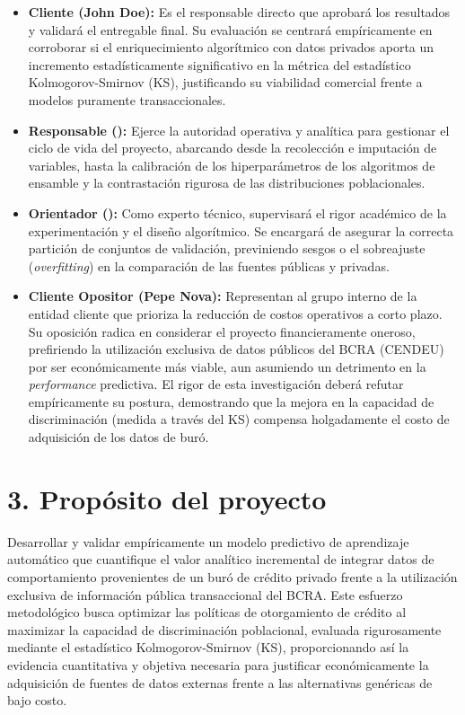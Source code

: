 \documentclass[
11pt, %
]{charter}
\begin{document}
\begin{itemize}
\item \textbf{Cliente (John Doe):} Es el responsable directo que aprobará los resultados y validará el entregable final. Su evaluación se centrará empíricamente en corroborar si el enriquecimiento algorítmico con datos privados aporta un incremento estadísticamente significativo en la métrica del estadístico Kolmogorov-Smirnov (KS), justificando su viabilidad comercial frente a modelos puramente transaccionales.
\item \textbf{Responsable (\authorname):} Ejerce la autoridad operativa y analítica para gestionar el ciclo de vida del proyecto, abarcando desde la recolección e imputación de variables, hasta la calibración de los hiperparámetros de los algoritmos de ensamble y la contrastación rigurosa de las distribuciones poblacionales.
\item \textbf{Orientador (\supname):} Como experto técnico, supervisará el rigor académico de la experimentación y el diseño algorítmico. Se encargará de asegurar la correcta partición de conjuntos de validación, previniendo sesgos o el sobreajuste (\textit{overfitting}) en la comparación de las fuentes públicas y privadas.
\item \textbf{Cliente Opositor (Pepe Nova):} Representan al grupo interno de la entidad cliente que prioriza la reducción de costos operativos a corto plazo. Su oposición radica en considerar el proyecto financieramente oneroso, prefiriendo la utilización exclusiva de datos públicos del BCRA (CENDEU) por ser económicamente más viable, aun asumiendo un detrimento en la \textit{performance} predictiva. El rigor de esta investigación deberá refutar empíricamente su postura, demostrando que la mejora en la capacidad de discriminación (medida a través del KS) compensa holgadamente el costo de adquisición de los datos de buró.
\end{itemize}

\section{3. Propósito del proyecto}
\label{sec:proposito}

Desarrollar y validar empíricamente un modelo predictivo de aprendizaje automático que cuantifique el valor analítico incremental de integrar datos de comportamiento provenientes de un buró de crédito privado frente a la utilización exclusiva de información pública transaccional del BCRA. Este esfuerzo metodológico busca optimizar las políticas de otorgamiento de crédito al maximizar la capacidad de discriminación poblacional, evaluada rigurosamente mediante el estadístico Kolmogorov-Smirnov (KS), proporcionando así la evidencia cuantitativa y objetiva necesaria para justificar económicamente la adquisición de fuentes de datos externas frente a las alternativas genéricas de bajo costo.
\end{document}
